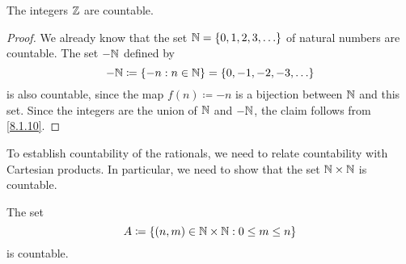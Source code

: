 \begin{cor}\label{8.1.11}
	The integers \(\mathbb{Z}\) are countable.
\end{cor}

\begin{proof}
	We already know that the set \(\N = \set{0, 1, 2, 3, \dots}\) of natural numbers are countable.
	The set \(-\mathbb{N}\) defined by
	\[
		-\N \coloneqq \set{-n : n \in \N} = \set{0, -1, -2, -3, \dots}
	\]
	is also countable, since the map \(f(n) \coloneqq -n\) is a bijection between \(\mathbb{N}\) and this set.
	Since the integers are the union of \(\mathbb{N}\) and \(-\mathbb{N}\), the claim follows from \cref{8.1.10}.
\end{proof}

\begin{note}
	To establish countability of the rationals, we need to relate countability with Cartesian products.
	In particular, we need to show that the set \(\mathbb{N} \times \mathbb{N}\) is countable.
\end{note}

\begin{lem}\label{8.1.12}
	The set
	\[
		A \coloneqq \left\lbrace(n, m) \in \mathbb{N} \times \mathbb{N} : 0 \leq m \leq n\right\rbrace
	\]
	is countable.
\end{lem}

